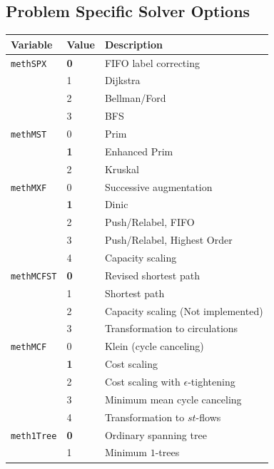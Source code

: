\documentclass[a4paper,11pt,twoside]{book}
\begin{document}
\begin{multicols}{2}
\subsection{Problem Specific Solver Options}
\label{slb_options_solver}
\medskip
\begin{center}
\begin{tabular}{|p{3cm}|p{1cm}|p{8cm}|}
\hline
{\bf Variable} & {\bf Value} & {\bf Description} \\
\hline
\hline
\verb/methSPX/      & {\bf 0} & FIFO label correcting \\
                    & 1 & Dijkstra \\
                    & 2 & Bellman/Ford \\
                    & 3 & BFS \\
\hline
\verb/methMST/      & 0 & Prim \\
                    & {\bf 1} & Enhanced Prim \\
                    & 2 & Kruskal \\
\hline
\verb/methMXF/      & 0 & Successive augmentation \\
                    & {\bf 1} & Dinic \\
                    & 2 & Push/Relabel, FIFO \\
                    & 3 & Push/Relabel, Highest Order \\
                    & 4 & Capacity scaling \\
\hline
\verb/methMCFST/    & {\bf 0} & Revised shortest path \\
                    & 1 & Shortest path \\
                    & 2 & Capacity scaling (Not implemented) \\
                    & 3 & Transformation to circulations \\
\hline
\verb/methMCF/      & 0 & Klein (cycle canceling) \\
                    & {\bf 1} & Cost scaling \\
                    & 2 & Cost scaling with $\epsilon$-tightening \\
                    & 3 & Minimum mean cycle canceling \\
                    & 4 & Transformation to $st$-flows \\
\hline
\verb/meth1Tree/    & {\bf 0} & Ordinary spanning tree \\
                    & 1 & Minimum $1$-trees \\
\hline

\end{tabular}
\end{center}
\end{multicols}
\end{document}
